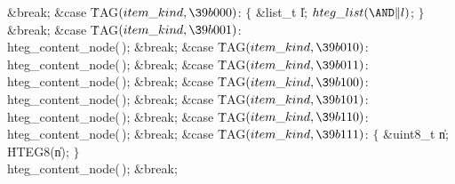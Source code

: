 \&{break};\7
\4\&{case} \.{TAG}${}(\index{item kind+\\{item\_kind}}\\{item\_kind},\39\\{b000}){}$:\5
\1${}\{{}$\5
\&{list\_t} \|l;\5
${}\index{hteg list+\\{hteg\_list}}\\{hteg\_list}({\AND}\|l){}$;\5
${}\}{}$\5
\2\&{break};\6
\4\&{case} \.{TAG}${}(\index{item kind+\\{item\_kind}}\\{item\_kind},\39\\{b001}){}$:\5
\\{hteg\_content\_node}(\,);\5
\&{break};\6
\4\&{case} \.{TAG}${}(\index{item kind+\\{item\_kind}}\\{item\_kind},\39\\{b010}){}$:\5
\\{hteg\_content\_node}(\,);\5
\&{break};\6
\4\&{case} \.{TAG}${}(\index{item kind+\\{item\_kind}}\\{item\_kind},\39\\{b011}){}$:\5
\\{hteg\_content\_node}(\,);\5
\&{break};\6
\4\&{case} \.{TAG}${}(\index{item kind+\\{item\_kind}}\\{item\_kind},\39\\{b100}){}$:\5
\\{hteg\_content\_node}(\,);\5
\&{break};\6
\4\&{case} \.{TAG}${}(\index{item kind+\\{item\_kind}}\\{item\_kind},\39\\{b101}){}$:\5
\\{hteg\_content\_node}(\,);\5
\&{break};\6
\4\&{case} \.{TAG}${}(\index{item kind+\\{item\_kind}}\\{item\_kind},\39\\{b110}){}$:\5
\\{hteg\_content\_node}(\,);\5
\&{break};\6
\4\&{case} \.{TAG}${}(\index{item kind+\\{item\_kind}}\\{item\_kind},\39\\{b111}){}$:\1\6
\4${}\{{}$\5
\&{uint8\_t} \|n;\5
\.{HTEG8}(\|n);\5
${}\}{}$\5
\2\\{hteg\_content\_node}(\,);\5
\&{break};
\Y
\fi

